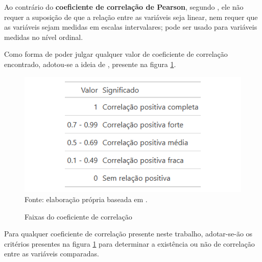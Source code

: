 Ao contrário do \textbf{coeficiente de correlação de Pearson}, segundo \cite{hauke2011comparison}, ele não requer a suposição de que a relação entre as variáveis seja linear, nem requer que as variáveis sejam medidas em escalas intervalares; pode ser usado para variáveis medidas no nível ordinal.

Como forma de poder julgar qualquer valor de coeficiente de correlação encontrado, adotou-se a ideia de \cite{ali2022spearman}, presente na figura \ref{fig:tabela_faixas_correlacao}.

\begin{figure}[H]
    \centering
    \caption{Faixas do coeficiente de correlação}
    \includegraphics[width=1\linewidth]{figuras/tabela_faixas_correlacao}
    \label{fig:tabela_faixas_correlacao}
    \footnotesize{Fonte: elaboração própria baseada em \cite{ali2022spearman}.}
\end{figure}

Para qualquer coeficiente de correlação presente neste trabalho, adotar-se-ão os critérios presentes na figura \ref{fig:tabela_faixas_correlacao} para determinar a existência ou não de correlação entre as variáveis comparadas.